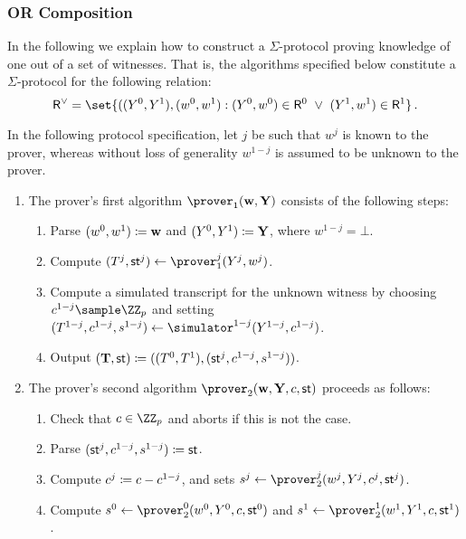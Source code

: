 \documentclass[runningheads,11pt]{article}
\begin{document}
\subsubsection{OR Composition}
  In the following we explain how to construct a $\Sigma$-protocol proving knowledge of one out of a set of witnesses.
  That is, the algorithms specified below constitute a $\Sigma$-protocol for the following relation:
\[
  \relation^\lor = \set{
    ((\statement^0,\statement^1),(\witness^0,\witness^1) :
    (\statement^0,\witness^0)\in \relation^0 ~\lor~ (\statement^1,\witness^1)\in\relation^1}\,.
\]

  In the following protocol specification, let $j$ be such that $w^j$ is known to the prover, whereas without loss of generality $w^{1-j}$ is assumed to be unknown to the prover.
\begin{enumerate}
  \item
    The prover's first algorithm $\prover_1(\vec \witness, \vec \statement)$ consists of the following steps:
    \begin{enumerate}
      \item
        Parse $(w^0,w^1)\coloneqq \mathbf {w}$ and $(Y^0,Y^1)\coloneqq \mathbf {Y}$, where $w^{1-j}=\bot$.
      \item
        Compute $(\commitment^j,\st^j)\gets\prover_1^j(Y^j,w^j)$.
      \item
        Compute a simulated transcript for the unknown witness by choosing $c^{1-j}\sample\ZZ_p$ and setting $(\commitment^{1-j},c^{1-j},s^{1-j})\gets\simulator^{1-j}(Y^{1-j},c^{1-j})$.
      \item
	Output $(\mathbf {T},\mathsf{st}) \coloneqq ((T^0,T^1),(\mathsf{st}^j,c^{1-j},s^{1-j}))$.
    \end{enumerate}
  \item
    The prover's second algorithm $\prover_2(\vec \witness, \vec \statement,\challenge,\st)$ proceeds as follows:
    \begin{enumerate}
      \item
        Check that $c\in\ZZ_p$ and aborts if this is not the case.
      \item Parse $(\mathsf{st}^j,c^{1-j},s^{1-j})\coloneqq\mathsf{st}$.
      \item
        Compute $c^j\coloneqq c-c^{1-j}$, and sets $s^j\gets\prover_2^j(w^j,Y^j,c^j,\st^j)$.
      \item
        Compute $s^0\gets\prover_2^0(\witness^0,\statement^0,\challenge,\st^0)$ and $s^1\gets\prover_2^1(\witness^1,\statement^1,\challenge,\st^1)$.

\end{enumerate}
\end{enumerate}
\end{document}
